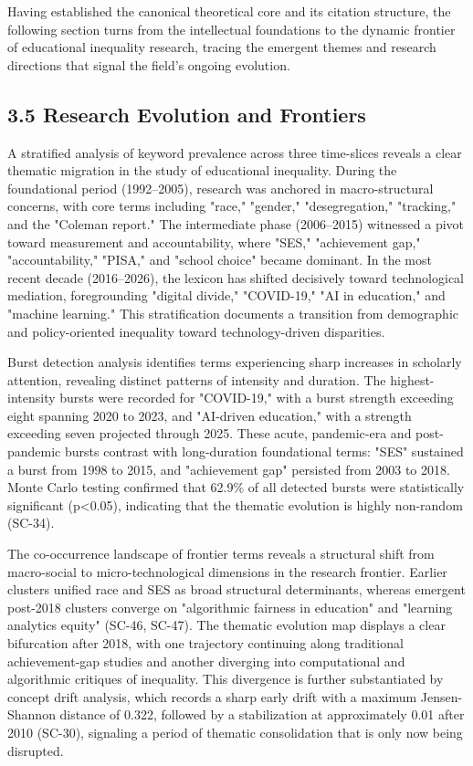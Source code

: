 \documentclass[12pt,a4paper]{article}
\begin{document}
Having established the canonical theoretical core and its citation structure, the following section turns from the intellectual foundations to the dynamic frontier of educational inequality research, tracing the emergent themes and research directions that signal the field's ongoing evolution.

\subsection{3.5 Research Evolution and Frontiers}

A stratified analysis of keyword prevalence across three time-slices reveals a clear thematic migration in the study of educational inequality. During the foundational period (1992–2005), research was anchored in macro-structural concerns, with core terms including "race," "gender," "desegregation," "tracking," and the "Coleman report." The intermediate phase (2006–2015) witnessed a pivot toward measurement and accountability, where "SES," "achievement gap," "accountability," "PISA," and "school choice" became dominant. In the most recent decade (2016–2026), the lexicon has shifted decisively toward technological mediation, foregrounding "digital divide," "COVID-19," "AI in education," and "machine learning." This stratification documents a transition from demographic and policy-oriented inequality toward technology-driven disparities.

Burst detection analysis identifies terms experiencing sharp increases in scholarly attention, revealing distinct patterns of intensity and duration. The highest-intensity bursts were recorded for "COVID-19," with a burst strength exceeding eight spanning 2020 to 2023, and "AI-driven education," with a strength exceeding seven projected through 2025. These acute, pandemic-era and post-pandemic bursts contrast with long-duration foundational terms: "SES" sustained a burst from 1998 to 2015, and "achievement gap" persisted from 2003 to 2018. Monte Carlo testing confirmed that 62.9\% of all detected bursts were statistically significant (p<0.05), indicating that the thematic evolution is highly non-random (SC-34).

The co-occurrence landscape of frontier terms reveals a structural shift from macro-social to micro-technological dimensions in the research frontier. Earlier clusters unified race and SES as broad structural determinants, whereas emergent post-2018 clusters converge on "algorithmic fairness in education" and "learning analytics equity" (SC-46, SC-47). The thematic evolution map displays a clear bifurcation after 2018, with one trajectory continuing along traditional achievement-gap studies and another diverging into computational and algorithmic critiques of inequality. This divergence is further substantiated by concept drift analysis, which records a sharp early drift with a maximum Jensen-Shannon distance of 0.322, followed by a stabilization at approximately 0.01 after 2010 (SC-30), signaling a period of thematic consolidation that is only now being disrupted.
\end{document}
